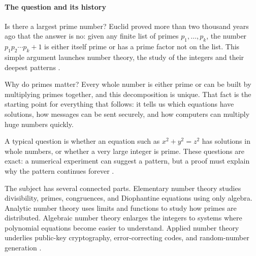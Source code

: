 
\paragraph{The question and its history}
Is there a largest prime number? Euclid proved more than two thousand years ago that the answer is no: given any finite list of primes $p_1,\ldots,p_k$, the number $p_1p_2\cdots p_k+1$ is either itself prime or has a prime factor not on the list. This simple argument launches number theory, the study of the integers and their deepest patterns \cite{number_theory_ref1}.

Why do primes matter? Every whole number is either prime or can be built by multiplying primes together, and this decomposition is unique. That fact is the starting point for everything that follows: it tells us which equations have solutions, how messages can be sent securely, and how computers can multiply huge numbers quickly.

A typical question is whether an equation such as $x^2+y^2=z^2$ has solutions in whole numbers, or whether a very large integer is prime. These questions are exact: a numerical experiment can suggest a pattern, but a proof must explain why the pattern continues forever \cite{number_theory_ref1}.

The subject has several connected parts. Elementary number theory studies divisibility, primes, congruences, and Diophantine equations using only algebra. Analytic number theory uses limits and functions to study how primes are distributed. Algebraic number theory enlarges the integers to systems where polynomial equations become easier to understand. Applied number theory underlies public-key cryptography, error-correcting codes, and random-number generation \cite{number_theory_ref1,number_theory_ref2}.

